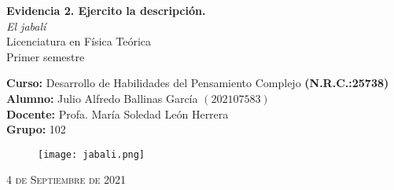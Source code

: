 \documentclass[12pt]{article}
\begin{document}
\thispagestyle{empty} 
\begin{center} \LARGE{\bf Evidencia 2. Ejercito la descripción.} \\[0.5cm]
\LARGE{\textit{\textsf{El jabalí}}}\\[0.5cm]
\Large{Licenciatura en Física Teórica}\\[0.5cm]
\large{Primer semestre} \end{center}
\large{\bf Curso: } Desarrollo de Habilidades del Pensamiento Complejo \textbf{(N.R.C.:25738)}\\
\large{\bf Alumno:} Julio Alfredo Ballinas García $\left(202107583\right)$ \\
\large{\bf Docente:} Profa. María Soledad León Herrera\\
\large{\bf Grupo:} 102\\ 
\begin{figure}[htb] \centering \texttt{[image: jabali.png]} \end{figure} 

\begin{center} 
\vfill
\textsc{4 de Septiembre de 2021} \end{center}  
\newpage
\end{document}
